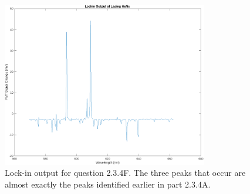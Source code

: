 \documentclass[letterpaper, reqno,11pt]{article}
\begin{document}
\begin{figure}[htpb]
    \centering
    \includegraphics[width=0.8\textwidth]{4F}
    \caption{Lock-in output for question 2.3.4F. The three peaks that occur are almost exactly the peaks identified earlier in part 2.3.4A.}
    \label{fig:4F}
\end{figure}
\end{document}

